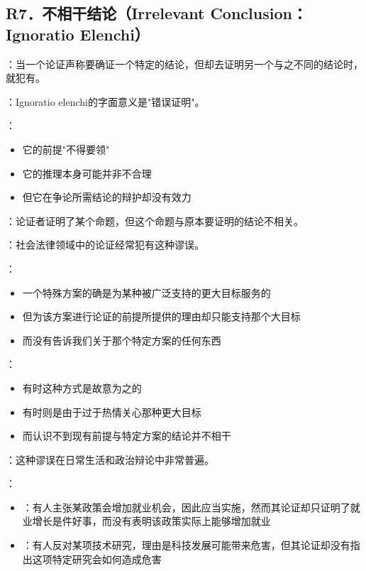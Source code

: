\subsection{R7．不相干结论（Irrelevant Conclusion：Ignoratio Elenchi）}

\begin{theorembox}[title=不相干结论谬误的定义与特征]
：当一个论证声称要确证一个特定的结论，但却去证明另一个与之不同的结论时，就犯有。

：Ignoratio elenchi的字面意义是"错误证明"。

：
\begin{itemize}
  \item 它的前提"不得要领"
  \item 它的推理本身可能并非不合理
  \item 但它在争论所需结论的辩护却没有效力
\end{itemize}

：论证者证明了某个命题，但这个命题与原本要证明的结论不相关。
\end{theorembox}

\begin{examplebox}[title=政策辩论中的不相干结论]
：社会法律领域中的论证经常犯有这种谬误。

：
\begin{itemize}
  \item 一个特殊方案的确是为某种被广泛支持的更大目标服务的
  \item 但为该方案进行论证的前提所提供的理由却只能支持那个大目标
  \item 而没有告诉我们关于那个特定方案的任何东西
\end{itemize}

：
\begin{itemize}
  \item 有时这种方式是故意为之的
  \item 有时则是由于过于热情关心那种更大目标
  \item 而认识不到现有前提与特定方案的结论并不相干
\end{itemize}
\end{examplebox}

\begin{examplebox}[title=不相干结论的常见形式]
：这种谬误在日常生活和政治辩论中非常普遍。

：
\begin{itemize}
  \item {}：有人主张某政策会增加就业机会，因此应当实施，然而其论证却只证明了就业增长是件好事，而没有表明该政策实际上能够增加就业
  \item {}：有人反对某项技术研究，理由是科技发展可能带来危害，但其论证却没有指出这项特定研究会如何造成危害
\end{itemize}
\end{examplebox}

